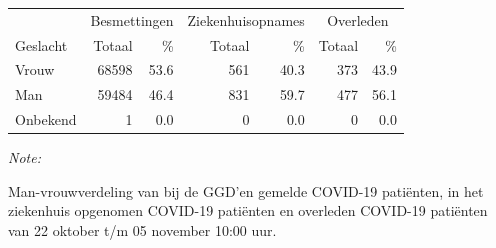 \documentclass[
  english,
  man,floatsintext]{apa6}
\begin{document}
\begin{table}[H]
\centering\begingroup\fontsize{11}{13}\selectfont

\begin{threeparttable}
\begin{tabular}{lrrrrrr}
\toprule
\multicolumn{1}{c}{ } & \multicolumn{2}{c}{Besmettingen} & \multicolumn{2}{c}{Ziekenhuisopnames} & \multicolumn{2}{c}{Overleden} \\
\cmidrule(l{3pt}r{3pt}){2-3} \cmidrule(l{3pt}r{3pt}){4-5} \cmidrule(l{3pt}r{3pt}){6-7}
Geslacht & Totaal & \% & Totaal & \% & Totaal & \%\\
\midrule
Vrouw & 68598 & 53.6 & 561 & 40.3 & 373 & 43.9\\
Man & 59484 & 46.4 & 831 & 59.7 & 477 & 56.1\\
Onbekend & 1 & 0.0 & 0 & 0.0 & 0 & 0.0\\
\bottomrule
\end{tabular}
\begin{tablenotes}
\item \textit{Note: } 
\item Man-vrouwverdeling van bij de GGD’en gemelde COVID-19 patiënten, in het ziekenhuis opgenomen COVID-19 patiënten en overleden COVID-19 patiënten van 22 oktober t/m 05 november 10:00 uur.
\end{tablenotes}
\end{threeparttable}
\endgroup{}
\end{table}
\newpage
\end{document}
